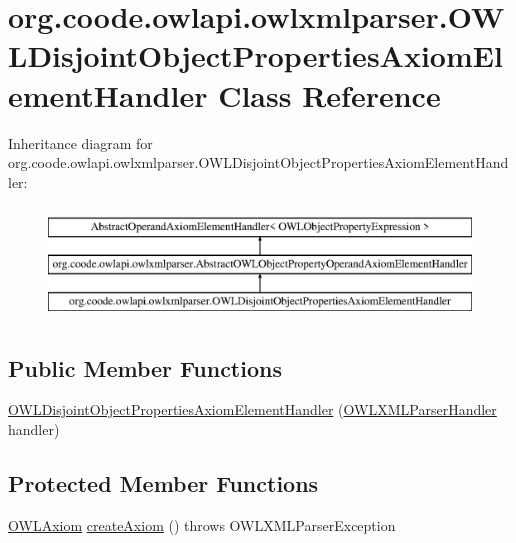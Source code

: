 \hypertarget{classorg_1_1coode_1_1owlapi_1_1owlxmlparser_1_1_o_w_l_disjoint_object_properties_axiom_element_handler}{\section{org.\-coode.\-owlapi.\-owlxmlparser.\-O\-W\-L\-Disjoint\-Object\-Properties\-Axiom\-Element\-Handler Class Reference}
\label{classorg_1_1coode_1_1owlapi_1_1owlxmlparser_1_1_o_w_l_disjoint_object_properties_axiom_element_handler}
}
Inheritance diagram for org.\-coode.\-owlapi.\-owlxmlparser.\-O\-W\-L\-Disjoint\-Object\-Properties\-Axiom\-Element\-Handler\-:\begin{figure}[H]
\begin{center}
\leavevmode
\includegraphics[height=3.000000cm]{classorg_1_1coode_1_1owlapi_1_1owlxmlparser_1_1_o_w_l_disjoint_object_properties_axiom_element_handler}
\end{center}
\end{figure}
\subsection*{Public Member Functions}
\begin{DoxyCompactItemize}
\item 
\hyperlink{classorg_1_1coode_1_1owlapi_1_1owlxmlparser_1_1_o_w_l_disjoint_object_properties_axiom_element_handler_ab4445b1ddfff088cb1abff61037eaf77}{O\-W\-L\-Disjoint\-Object\-Properties\-Axiom\-Element\-Handler} (\hyperlink{classorg_1_1coode_1_1owlapi_1_1owlxmlparser_1_1_o_w_l_x_m_l_parser_handler}{O\-W\-L\-X\-M\-L\-Parser\-Handler} handler)
\end{DoxyCompactItemize}
\subsection*{Protected Member Functions}
\begin{DoxyCompactItemize}
\item 
\hyperlink{interfaceorg_1_1semanticweb_1_1owlapi_1_1model_1_1_o_w_l_axiom}{O\-W\-L\-Axiom} \hyperlink{classorg_1_1coode_1_1owlapi_1_1owlxmlparser_1_1_o_w_l_disjoint_object_properties_axiom_element_handler_a886331496e12e65f1d367a4df4461712}{create\-Axiom} ()  throws O\-W\-L\-X\-M\-L\-Parser\-Exception 
\end{DoxyCompactItemize}


